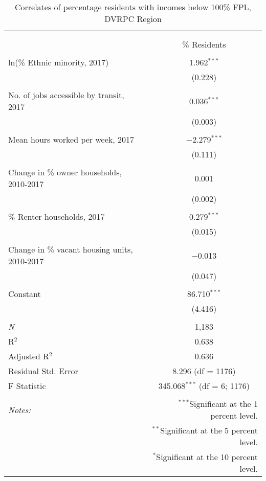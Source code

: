 \documentclass[paper=letterpaper, fontsize=11pt]{scrartcl}
\begin{document}
\begin{table}[!htbp] \centering 
	\caption{Correlates of percentage residents with incomes below 100\% FPL, DVRPC Region} 
		\label{} 
		\begin{tabular}{@{\extracolsep{5pt}}lc} 
			\\[-1.8ex]\hline 
			\hline \\[-1.8ex] 
			\\[-1.8ex] & \% Residents \\ 
			\hline \\[-1.8ex] 
			ln(\% Ethnic minority, 2017) & 1.962$^{***}$ \\ 
			& (0.228) \\ 
			& \\ 
			No. of jobs accessible by transit, 2017 & 0.036$^{***}$ \\ 
			& (0.003) \\ 
			& \\ 
			Mean hours worked per week, 2017 & $-$2.279$^{***}$ \\ 
			& (0.111) \\ 
			& \\ 
			Change in \% owner households, 2010-2017 & 0.001 \\ 
			& (0.002) \\ 
			& \\ 
			\% Renter households, 2017 & 0.279$^{***}$ \\ 
			& (0.015) \\ 
			& \\ 
			Change in \% vacant housing units, 2010-2017 & $-$0.013 \\ 
			& (0.047) \\ 
			& \\ 
			Constant & 86.710$^{***}$ \\ 
			& (4.416) \\ 
			& \\ 
			\textit{N} & 1,183 \\ 
			R$^{2}$ & 0.638 \\ 
			Adjusted R$^{2}$ & 0.636 \\ 
			Residual Std. Error & 8.296 (df = 1176) \\ 
			F Statistic & 345.068$^{***}$ (df = 6; 1176) \\ 
			\hline 
			\hline \\[-1.8ex] 
			\textit{Notes:} & \multicolumn{1}{r}{$^{***}$Significant at the 1 percent level.} \\ 
			& \multicolumn{1}{r}{$^{**}$Significant at the 5 percent level.} \\ 
			& \multicolumn{1}{r}{$^{*}$Significant at the 10 percent level.} \\ 
		\end{tabular} 
	\end{table} 
\end{document}
